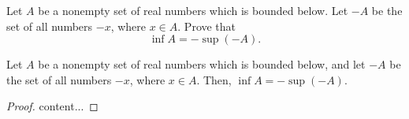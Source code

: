 \begin{exercise}
	Let $A$ be a nonempty set of real numbers which is bounded below. Let $-A$ be the set of all numbers $-x$, where $x \in A$. Prove that
	\begin{equation*}
	\inf A = - \sup \left( -A \right).
	\end{equation*}
\end{exercise}
\begin{proposition}
	Let $A$ be a nonempty set of real numbers which is bounded below, and let $-A$ be the set of all numbers $-x$, where $x \in A$. Then, $\inf A = - \sup \left( -A \right)$.
\end{proposition}
\begin{proof}
	content...
\end{proof}
